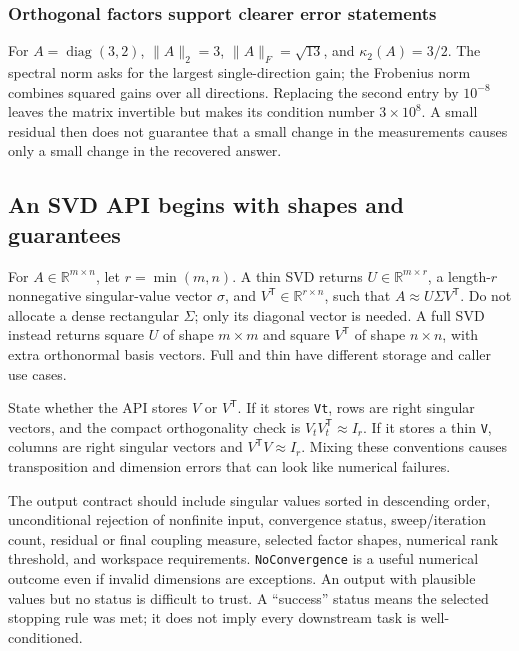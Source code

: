 \subsubsection{Orthogonal factors support clearer error statements}\label{orthogonal-factors-support-clearer-error-statements}

For \(A=\operatorname{diag}(3,2)\), \(\|A\|_2=3\), \(\|A\|_F=\sqrt{13}\), and \(\kappa_2(A)=3/2\). The spectral norm asks for the largest single-direction gain; the Frobenius norm combines squared gains over all directions. Replacing the second entry by \(10^{-8}\) leaves the matrix invertible but makes its condition number \(3\times10^8\). A small residual then does not guarantee that a small change in the measurements causes only a small change in the recovered answer.

\subsection{An SVD API begins with shapes and guarantees}\label{an-svd-api-begins-with-shapes-and-guarantees}

For \(A\in\mathbb R^{m\times n}\), let \(r=\min(m,n)\). A thin SVD returns \(U\in\mathbb R^{m\times r}\), a length-\(r\) nonnegative singular-value vector \(\sigma\), and \(V^\mathsf T\in\mathbb R^{r\times n}\), such that \(A\approx U\Sigma V^\mathsf T\). Do not allocate a dense rectangular \(\Sigma\); only its diagonal vector is needed. A full SVD instead returns square \(U\) of shape \(m\times m\) and square \(V^\mathsf T\) of shape \(n\times n\), with extra orthonormal basis vectors. Full and thin have different storage and caller use cases.

State whether the API stores \(V\) or \(V^\mathsf T\). If it stores \texttt{Vt}, rows are right singular vectors, and the compact orthogonality check is \(V_tV_t^\mathsf T\approx I_r\). If it stores a thin \texttt{V}, columns are right singular vectors and \(V^\mathsf TV\approx I_r\). Mixing these conventions causes transposition and dimension errors that can look like numerical failures.

The output contract should include singular values sorted in descending order, unconditional rejection of nonfinite input, convergence status, sweep/iteration count, residual or final coupling measure, selected factor shapes, numerical rank threshold, and workspace requirements. \texttt{NoConvergence} is a useful numerical outcome even if invalid dimensions are exceptions. An output with plausible values but no status is difficult to trust. A ``success'' status means the selected stopping rule was met; it does not imply every downstream task is well-conditioned.

